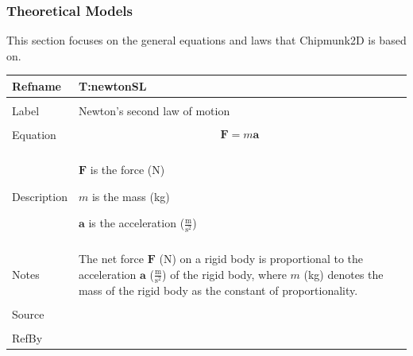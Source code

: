\documentclass[12pt]{article}
\begin{document}
\subsubsection{Theoretical Models}
\label{Sec:TMs}
This section focuses on the general equations and laws that Chipmunk2D is based on.
~\newline
\noindent \begin{minipage}{\textwidth}
\begin{tabular}{p{} p{}}
\toprule \textbf{Refname} & \textbf{T:newtonSL}
\label{T:newtonSL}
\\ \midrule \\
Label & Newton's second law of motion
\\ \midrule \\
Equation & \begin{dmath}
           \mathbf{F}=m \mathbf{a}
           \end{dmath}
\\ \midrule \\
Description & \begin{symbDescription}
              \item{$\mathbf{F}$ is the force (N)}
              \item{$m$ is the mass (kg)}
              \item{$\mathbf{a}$ is the acceleration ($\frac{\text{m}}{\text{s}^{2}}$)}
              \end{symbDescription}
\\ \midrule \\
Notes & The net force $\mathbf{F}$ (N) on a rigid body is proportional to the acceleration $\mathbf{a}$ ($\frac{\text{m}}{\text{s}^{2}}$) of the rigid body, where $m$ (kg) denotes the mass of the rigid body as the constant of proportionality.
\\ \midrule \\
Source & 
\\ \midrule \\
RefBy & 
\\ \bottomrule \end{tabular}
\end{minipage}\\
~\newline
\end{document}
